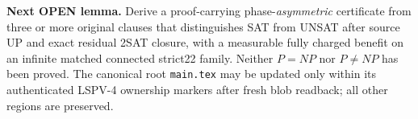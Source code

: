 \documentclass[10pt]{article}
\begin{document}
\noindent\textbf{Next OPEN lemma.} Derive a proof-carrying phase-\emph{asymmetric} certificate from three or more original clauses that distinguishes SAT from UNSAT after source UP and exact residual 2SAT closure, with a measurable fully charged benefit on an infinite matched connected strict22 family. Neither $P=NP$ nor $P\ne NP$ has been proved. The canonical root \texttt{main.tex} may be updated only within its authenticated LSPV-4 ownership markers after fresh blob readback; all other regions are preserved.

\end{document}
